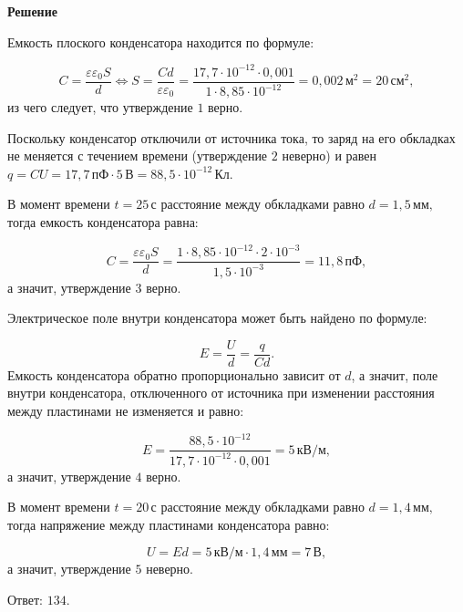 \documentclass[12pt,a4paper]{article}
\begin{document}
{\begin{center}\end{center}
\par
}{
\smallskip\noindent\textbf{Решение}\par
Емкость плоского конденсатора находится по формуле:\par
\[C= \frac{ \varepsilon \varepsilon _{0} S}{ d } \Longleftrightarrow S= \frac{ Cd}{ \varepsilon \varepsilon _{0} } = \frac{ 17{,}7 \cdot 10 ^{ - 12 } \cdot 0{,}001}{ 1 \cdot 8{,}85 \cdot 10 ^{ - 12 } } =0{,}002\,\text{м} ^2 =20\,\text{см} ^2 ,\]
из чего следует, что утверждение $1$ верно.\par
Поскольку конденсатор отключили от источника тока, то заряд на его обкладках не меняется с течением времени (утверждение $2$ неверно) и равен $q=CU=17{,}7\,\text{пФ} \cdot 5\,\text{В}=88{,}5 \cdot 10 ^{ - 12 } \,\text{Кл}.$\par
В момент времени $t=25 \,\text{с}$ расстояние между обкладками равно $d =1{,}5\,\text{мм},$ тогда емкость конденсатора равна:\par
\[C= \frac{ \varepsilon \varepsilon _{0} S}{ d } = \frac{ 1 \cdot 8{,}85 \cdot 10 ^{ - 12 } \cdot 2 \cdot 10 ^{ - 3 } }{ 1{,}5 \cdot 10 ^{ - 3 } } =11{,}8\,\text{пФ},\]
а значит, утверждение $3$ верно.\par
Электрическое поле внутри конденсатора может быть найдено по формуле:\par
\[E= \frac{ U}{ d } = \frac{ q}{ Cd } .\]
Емкость конденсатора обратно пропорционально зависит от $d$, а значит, поле внутри конденсатора, отключенного от источника при изменении расстояния между пластинами не изменяется и равно:\par
\[E= \frac{ 88{,}5 \cdot 10 ^{ - 12 } }{ 17{,}7 \cdot 10 ^{ - 12 } \cdot 0{,}001 } =5\,\text{кВ/м},\]
а значит, утверждение $4$ верно.\par
В момент времени $t=20 \,\text{с}$ расстояние между обкладками равно $d =1{,}4\,\text{мм},$ тогда напряжение между пластинами конденсатора равно:\par
\[U=Ed=5\,\text{кВ/м} \cdot 1{,}4\,\text{мм} = 7\,\text{В},\]
а значит, утверждение $5$ неверно.\par
Ответ: $134$.\par
}
\end{document}
